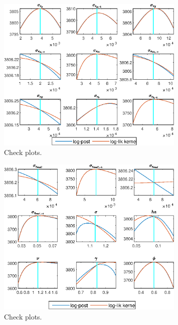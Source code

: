  
\begin{figure}[H]
\centering 
\includegraphics[width=0.80\textwidth]{BRS_sectoral_KK/graphs/BRS_sectoral_KK_CheckPlots1}
\caption{Check plots.}\label{Fig:CheckPlots:1}
\end{figure}
 
\begin{figure}[H]
\centering 
\includegraphics[width=0.80\textwidth]{BRS_sectoral_KK/graphs/BRS_sectoral_KK_CheckPlots2}
\caption{Check plots.}\label{Fig:CheckPlots:2}
\end{figure}
 
